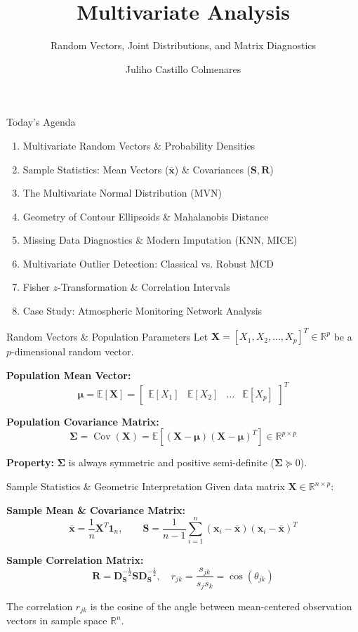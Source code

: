 \documentclass[aspectratio=169,ignorenonframetext]{beamer}
\title{\texorpdfstring{Multivariate Analysis}{Multivariate Analysis}}
\author{\texorpdfstring{Juliho Castillo
Colmenares}{Juliho Castillo Colmenares}}
\subtitle{Random Vectors, Joint Distributions, and Matrix Diagnostics}
\institute{Tec de Monterrey}
\date{}
\begin{document}
\frame{\titlepage}

\begin{frame}{Today's Agenda}
\begin{enumerate}
\item
  Multivariate Random Vectors \& Probability Densities
\item
  Sample Statistics: Mean Vectors (\(\overline{\mathbf{x}}\)) \&
  Covariances (\(\mathbf{S},\mathbf{R}\))
\item
  The Multivariate Normal Distribution (MVN)
\item
  Geometry of Contour Ellipsoids \& Mahalanobis Distance
\item
  Missing Data Diagnostics \& Modern Imputation (KNN, MICE)
\item
  Multivariate Outlier Detection: Classical vs. Robust MCD
\item
  Fisher \(z\)-Transformation \& Correlation Intervals
\item
  Case Study: Atmospheric Monitoring Network Analysis
\end{enumerate}
\end{frame}

\begin{frame}{Random Vectors \& Population Parameters}
Let
\(\mathbf{X} = \left\lbrack X_{1},X_{2},\ldots,X_{p} \right\rbrack^{T} \in \mathbb{R}^{p}\)
be a \(p\)-dimensional random vector.

\textbf{Population Mean Vector:}
\[\mathbf{\mu} = \mathbb{E}\left\lbrack \mathbf{X} \right\rbrack = \begin{bmatrix}
\mathbb{E}\left\lbrack X_{1} \right\rbrack & \mathbb{E}\left\lbrack X_{2} \right\rbrack & \ldots & \mathbb{E}\left\lbrack X_{p} \right\rbrack
\end{bmatrix}^{T}\]

\textbf{Population Covariance Matrix:}
\[\mathbf{\Sigma} = \operatorname{Cov}(\mathbf{X}) = \mathbb{E}\left\lbrack \left( \mathbf{X} - \mathbf{\mu} \right)\left( \mathbf{X} - \mathbf{\mu} \right)^{T} \right\rbrack \in \mathbb{R}^{p \times p}\]

\textbf{Property:} \(\mathbf{\Sigma}\) is always symmetric and positive
semi-definite (\(\mathbf{\Sigma} \succeq 0\)).
\end{frame}

\begin{frame}{Sample Statistics \& Geometric Interpretation}
Given data matrix \(\mathbf{X} \in \mathbb{R}^{n \times p}\):

\textbf{Sample Mean \& Covariance Matrix:}
\[\overline{\mathbf{x}} = \frac{1}{n}\mathbf{X}^{T}\mathbf{1}_{n},\quad\quad\mathbf{S} = \frac{1}{n - 1}\sum_{i = 1}^{n}\left( \mathbf{x}_{i} - \overline{\mathbf{x}} \right)\left( \mathbf{x}_{i} - \overline{\mathbf{x}} \right)^{T}\]

\textbf{Sample Correlation Matrix:}
\[\mathbf{R} = \mathbf{D}_{\mathbf{S}}^{- \frac{1}{2}}\mathbf{S}\mathbf{D}_{\mathbf{S}}^{- \frac{1}{2}},\quad r_{jk} = \frac{s_{jk}}{s_{j}s_{k}} = \cos(\theta_{jk})\]

The correlation \(r_{jk}\) is the cosine of the angle between
mean-centered observation vectors in sample space \(\mathbb{R}^{n}\).
\end{frame}
\end{document}
